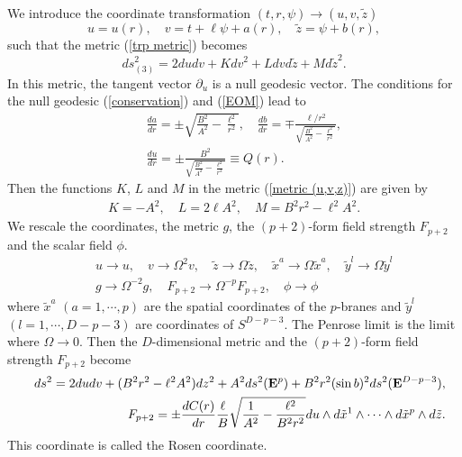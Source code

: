 \documentclass[a4paper,12pt]{article}
\begin{document}
We introduce the coordinate transformation $(t,r,\psi)\to (u,v,\tilde{z})$
\begin{equation}
u=u(r), \quad v=t+\ell\psi+a(r), \quad \tilde{z}=\psi +b(r),
\label{eq:uvz}
\end{equation}
such that the metric (\ref{trp metric}) becomes
\begin{equation}
ds_{(3)}^2=2dudv+Kdv^2+Ldvd\tilde{z}+Md\tilde{z}^2. 
\label{metric (u,v,z)}
\end{equation}
In this metric, the tangent vector $\partial_u$ is a null geodesic vector.
The conditions for the null geodesic (\ref{conservation}) and 
(\ref{EOM}) lead to
\begin{eqnarray}
&&\frac{da}{dr}=\pm\sqrt{\frac{B^2}{A^2}-\frac{\ell^2}{r^2}}, \quad
\frac{db}{dr}=\mp\frac{\ell/r^2}{\sqrt{\frac{B^2}{A^2}-\frac{\ell^2}{r^2}}},
\nonumber \\
&&\frac{du}{dr}=\pm \frac{B^2}{\sqrt{\frac{B^2}{A^2}-\frac{\ell^2}{r^2}}}   
\equiv Q(r).  
\label{Q(r)} 
\end{eqnarray}
Then the functions $K$, $L$ and $M$ in the metric (\ref{metric (u,v,z)}) 
are given by
\begin{eqnarray}
K=-A^2, \quad L=2\ell A^2, \quad M=B^2r^2-\ell^2A^2.
\end{eqnarray} 
We rescale the coordinates,
the metric $g$, the  $(p+2)$-form field strength $F_{p+2}$ 
and the scalar field $\phi$.
\begin{eqnarray}
&&u\to u,\quad v\to \Omega^2 v, \quad \tilde{z}\to \Omega \tilde{z}, 
\quad \tilde{x}^a\to \Omega \tilde{x}^a, 
\quad \tilde{y}^{l}\to \Omega \tilde{y}^{l}
\nonumber \\
&&
g\to \Omega^{-2} g, \quad 
F_{p+2}\to \Omega^{-p}F_{p+2}, \quad \phi\to \phi
\end{eqnarray} 
where $\tilde{x}^a$ $(a=1,\cdots ,p)$ are the spatial coordinates of
the $p$-branes and $\tilde{y}^l$ $(l=1,\cdots ,D-p-3)$ 
are coordinates of $S^{D-p-3}$.
The Penrose limit is the limit where 
$\Omega\to 0$.
Then the $D$-dimensional metric 
and the $(p+2)$-form field strength $F_{p+2}$ become
\begin{eqnarray}
&&ds^2=2dudv+(B^2r^2-\ell^2A^2)dz^2+A^2ds^2({\bf E}^p)
+B^2r^2(\sin b)^2 ds^2({\bf E}^{D-p-3}), \nonumber \\
&&F_{p+2}=\pm \frac{dC(r)}{dr}\frac{\ell}{B}
\sqrt{\frac{1}{A^2}-\frac{\ell^2}{B^2r^2}}
du\wedge d\tilde{x}^1 \wedge \cdots \wedge d\tilde{x}^p\wedge d\tilde{z}.
\label{Rosen}
\end{eqnarray}
This coordinate is called the Rosen coordinate. 
\end{document}
